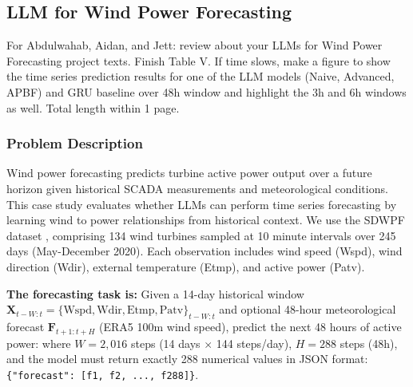 \documentclass[journal,onecolumn]{IEEEtran} %
\newcommand{\todo}[1]{\color{red}#1\color{black}}
\begin{document}
\subsection{LLM for Wind Power Forecasting}
\todo{For Abdulwahab, Aidan, and Jett: review about your LLMs for Wind Power Forecasting project texts. Finish Table V. If time slows, make a figure to show the time series prediction results for one of the LLM models (Naive, Advanced, APBF) and GRU baseline over 48h window and highlight the 3h and 6h windows as well. Total length within 1 page.}
\subsubsection*{\textbf{Problem Description}}
  Wind power forecasting predicts turbine active power output over a future horizon given historical SCADA measurements and meteorological conditions. This case study evaluates whether LLMs can perform time series forecasting by learning wind to power relationships from historical context. We use the SDWPF dataset \cite{zhou2024sdwpf}, comprising 134 wind turbines sampled at 10 minute intervals over 245 days (May-December 2020). Each observation includes wind speed (Wspd), wind direction (Wdir), external temperature (Etmp), and active power (Patv). 
  
  \textbf{The forecasting task is:} {Given a 14-day historical window $\mathbf{X}_{t-W:t} = \{\mathrm{Wspd}, \mathrm{Wdir}, \mathrm{Etmp}, \mathrm{Patv}\}_{t-W:t}$ and optional 48-hour meteorological forecast $\mathbf{F}_{t+1:t+H}$ (ERA5 100m wind speed), predict the next 48 hours of active power:} where $W = 2{,}016$ steps (14 days $\times$ 144 steps/day), $H = 288$ steps (48h), and the model must return exactly 288 numerical values in JSON format: \texttt{\{"forecast": [f1, f2, ..., f288]\}}.
\end{document}
